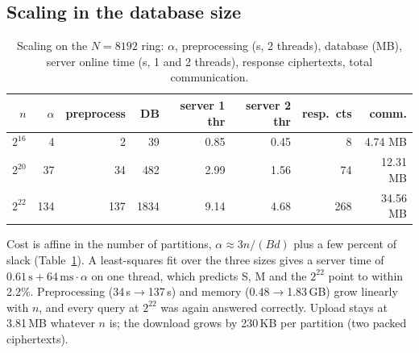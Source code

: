 \documentclass[11pt]{article}
\begin{document}
\subsection{Scaling in the database size}
\begin{table}[H]
\centering\small
\caption{Scaling on the $N=8192$ ring: $\alpha$, preprocessing (s, 2 threads), database (MB), server online time (s, 1 and 2 threads), response ciphertexts, total communication.}
\label{tab:scale}
\begin{tabular}{@{}rrrrrrrr@{}}
\toprule
$n$ & $\alpha$ & preprocess & DB & server 1 thr & server 2 thr & resp.\ cts & comm. \\
\midrule
$2^{16}$ & 4 & 2 & 39 & 0.85 & 0.45 & 8 & 4.74 MB \\
$2^{20}$ & 37 & 34 & 482 & 2.99 & 1.56 & 74 & 12.31 MB \\
$2^{22}$ & 134 & 137 & 1834 & 9.14 & 4.68 & 268 & 34.56 MB \\
\bottomrule
\end{tabular}
\end{table}
Cost is affine in the number of partitions, $\alpha\approx 3n/(Bd)$ plus a few percent of slack (Table~\ref{tab:scale}). A least-squares fit over the three sizes gives a server time of $0.61\,\mathrm{s}+64\,\mathrm{ms}\cdot\alpha$ on one thread, which predicts S, M and the $2^{22}$ point to within 2.2\%. Preprocessing (34\,s$\to$137\,s) and memory (0.48$\to$1.83\,GB) grow linearly with $n$, and every query at $2^{22}$ was again answered correctly. Upload stays at 3.81\,MB whatever $n$ is; the download grows by 230\,KB per partition (two packed ciphertexts).
\end{document}
